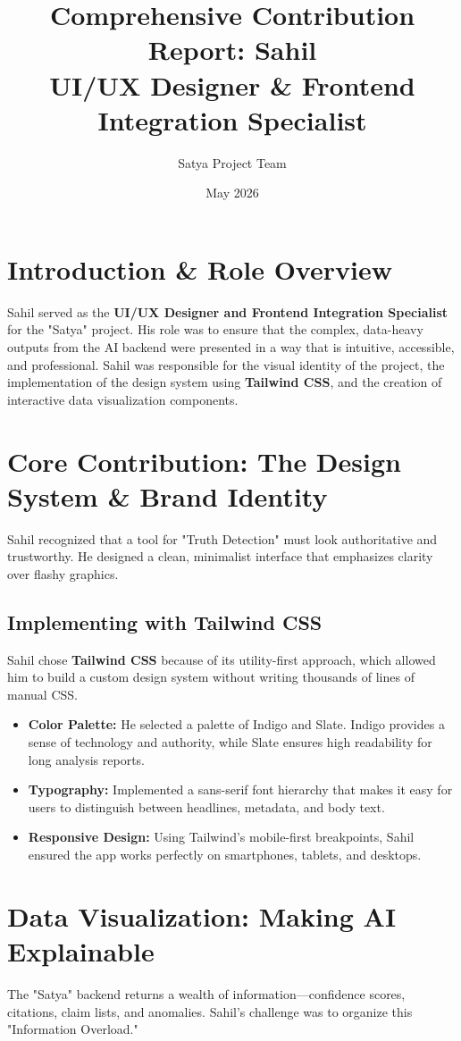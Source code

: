 \documentclass[12pt]{article}
\title{\textbf{Comprehensive Contribution Report: Sahil \\ UI/UX Designer \& Frontend Integration Specialist}}
\author{Satya Project Team}
\date{May 2026}
\begin{document}
\maketitle

\section{Introduction \& Role Overview}
Sahil served as the \textbf{UI/UX Designer and Frontend Integration Specialist} for the "Satya" project. His role was to ensure that the complex, data-heavy outputs from the AI backend were presented in a way that is intuitive, accessible, and professional. Sahil was responsible for the visual identity of the project, the implementation of the design system using \textbf{Tailwind CSS}, and the creation of interactive data visualization components.

\section{Core Contribution: The Design System \& Brand Identity}
Sahil recognized that a tool for "Truth Detection" must look authoritative and trustworthy. He designed a clean, minimalist interface that emphasizes clarity over flashy graphics.

\subsection{Implementing with Tailwind CSS}
Sahil chose \textbf{Tailwind CSS} because of its utility-first approach, which allowed him to build a custom design system without writing thousands of lines of manual CSS.
\begin{itemize}
    \item \textbf{Color Palette:} He selected a palette of Indigo and Slate. Indigo provides a sense of technology and authority, while Slate ensures high readability for long analysis reports.
    \item \textbf{Typography:} Implemented a sans-serif font hierarchy that makes it easy for users to distinguish between headlines, metadata, and body text.
    \item \textbf{Responsive Design:} Using Tailwind's mobile-first breakpoints, Sahil ensured the app works perfectly on smartphones, tablets, and desktops.
\end{itemize}

\section{Data Visualization: Making AI Explainable}
The "Satya" backend returns a wealth of information—confidence scores, citations, claim lists, and anomalies. Sahil's challenge was to organize this "Information Overload."
\end{document}
